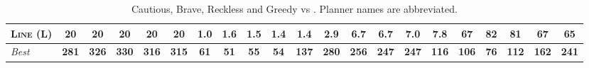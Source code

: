 \documentclass[11pt,landscape]{article}
\begin{document}
\begin{table}[tb]
{\begin{tabular}{|l||ccccc||ccccc||ccccc||ccccc||}
\textsc{Line} (L)&\textbf{20}&\textbf{20}&\textbf{20}&\textbf{20}&\textbf{20}&\textbf{1.0}&1.6&1.5&1.4&1.4&\textbf{2.9}&6.7&6.7&7.0&7.8&67&82&81&67&\textbf{65}
\\\hline
\textit{Best}&\textbf{281}&\textbf{326}&\textbf{330}&\textbf{316}&\textbf{315}&\textbf{61}&\textbf{51}&\textbf{55}&\textbf{54}&\textbf{137}&\textbf{280}&\textbf{256}&\textbf{247}&\textbf{247}&\textbf{116}&\textbf{106}&\textbf{76}&\textbf{112}&\textbf{162}&\textbf{241}\\\hline

        \end{tabular}}
        \caption{Cautious, Brave, Reckless and Greedy \pattyd vs \pattyo. Planner names are abbreviated.}
        \label{tab:cbrg}
        \end{table}
        
\end{document}

